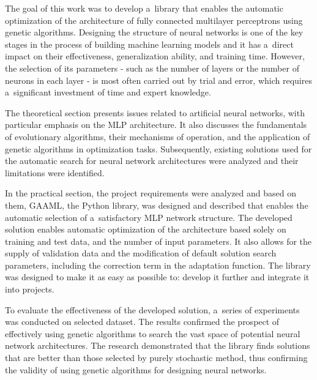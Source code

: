 The goal of this work was to develop
a~library that enables the automatic
optimization of the architecture
of fully connected multilayer perceptrons
using genetic algorithms.
Designing the structure of neural networks
is one of the key stages in the process
of building machine learning models
and it has a~direct impact on their effectiveness,
generalization ability, and training time.
However, the selection of its parameters
- such as the number of layers
or the number of neurons in each layer
- is most often carried out by trial and error,
which requires a~significant investment
of time and expert knowledge.

The theoretical section presents issues
related to artificial neural networks,
with particular emphasis on the \acrshort{MLP} architecture.
It also discusses the fundamentals
of evolutionary algorithms,
their mechanisms of operation,
and the application of genetic
algorithms in optimization tasks.
Subsequently, existing solutions used
for the automatic search for neural
network architectures were analyzed
and their limitations were identified.

In the practical section, the project requirements
were analyzed and based on them, \acrshort{GAAML},
the Python library, was designed and described
that enables the automatic selection
of a~satisfactory \acrshort{MLP} network structure.
The developed solution enables automatic
optimization of the architecture based solely
on training and test data,
and the number of input parameters.
It also allows for
the supply of validation data
and the modification of default
solution search parameters,
including the correction term
in the adaptation function.
The library was designed to make it
as easy as possible to:
develop it further
and integrate it into projects.

To evaluate the effectiveness
of the developed solution,
a~series of experiments was
conducted on selected dataset.
The results confirmed the prospect
of effectively using genetic algorithms
to search the vast space of potential
neural network architectures.
The research demonstrated that the library
finds solutions that are better than those
selected by purely stochastic method,
thus confirming the validity
of using genetic algorithms
for designing neural networks.
